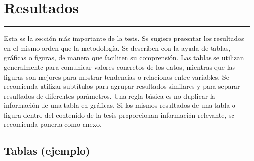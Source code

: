 \chapter{Resultados}\label{capit:cap3}
\vspace{-2.0325ex}%
\noindent
\rule{\textwidth}{0.5pt}
\vspace{-5.5ex}%
\newcommand{\pushline}{\Indp}%

Esta es la sección más importante de la tesis. Se sugiere presentar los resultados en el mismo orden que la metodología. Se describen con la ayuda de tablas, gráficas o figuras, de manera que faciliten su comprensión. Las tablas se utilizan generalmente para comunicar valores concretos de los datos, mientras que las figuras son mejores para mostrar tendencias o relaciones entre variables. Se recomienda utilizar subtítulos para agrupar resultados similares y para separar resultados de diferentes parámetros. Una regla básica es no duplicar la información de una tabla en gráficas. Si los mismos resultados de una tabla o figura dentro del contenido de la tesis proporcionan información relevante, se recomienda ponerla como anexo. 

\section{Tablas (ejemplo)}\label{secc:ejemplotab}


\begin{table}[ht]
\centering
{}
\caption{Esquema de codificación.}
\label{codschema}
\end{table}

	
\newpage

